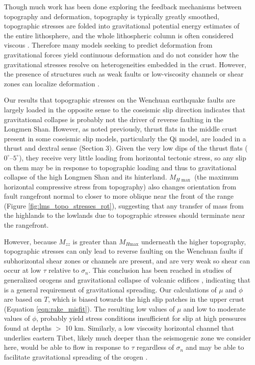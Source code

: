 \documentclass[draft,jgrga]{AGUTeX}
\begin{document}
\begin{article}
Though much work has been done exploring the feedback mechanisms between
topography and deformation, topography is typically greatly smoothed,
topographic stresses are folded into gravitational potential energy
estimates of the entire lithosphere, and the whole lithospheric column
is often considered viscous \citep[e.g.,][]{birdpiper80, copleymckenzie2007,
flesch2010gpe}. Therefore many
models seeking to predict deformation from gravitational forces yield
continuous deformation and do not consider how the gravitational
stresses resolve on heterogeneities embedded in the crust. However, the
presence of structures such as weak faults \citep{bird1994} or
low-viscosity channels or shear zones \citep[e.g.,][]{clark2005} can localize
deformation \citep[e.g.,][]{bird1994, fleschbendick2012}.

Our results that topographic stresses on the Wenchuan
earthquake faults are largely loaded in the opposite sense to the
coseismic slip direction indicates that gravitational collapse is probably
not the driver of reverse faulting in the Longmen Shan. However, as
noted previously, thrust flats in the middle crust present in some
coseismic slip models, particularly the Qi model, are loaded in a thrust
and dextral sense (Section 3). Given the very low dips of the thrust flats
($0^{\circ}$--$5^{\circ}$), they receive very little loading from
horizontal tectonic stress, so any slip on them may be in response to
topographic loading and thus to gravitational collapse of the high
Longmen Shan and its hinterland. $M_{H{\mathrm{\max}}}$ (the maximum horizontal
compressive stress from topography) also changes
orientation from fault rangefront normal to closer to more oblique
near the front of the range (Figure \ref{fig:lms_topo_stresses_rot}),
suggesting that any transfer of mass from the highlands to the lowlands
due to topographic stresses should terminate near the rangefront.

However, because $M_{zz}$ is greater than $M_{H{\mathrm{max}}}$
underneath the higher topography, topographic stresses can only lead to
reverse faulting on the Wenchuan faults if subhorizontal shear zones or
channels are present, and are very weak so shear can occur at 
low $\tau$ relative to $\sigma_n$. This conclusion has been reached in
studies of generalized orogens \citep[e.g.,][]{fleschbendick2012} and
gravitational collapse of volcanic edifices \citep[e.g.,][]{byrne2013},
indicating that is a general requirement of gravitational spreading. Our
calculations of $\mu$ and $\phi$ are based on $T$, which is biased
towards the high slip patches in the upper crust (Equation
\ref{eqn:rake_misfit}).  The resulting low values of $\mu$ and low
to moderate values of $\phi$, probably yield stress conditions insufficient
for slip at high pressures found at depths $>$ 10 km.
Similarly, a low viscosity horizontal
channel that underlies eastern Tibet, likely much deeper than the
seismogenic zone we consider here, would be able to flow in response to
$\tau$ regardless of $\sigma_n$ and may be able to facilitate
gravitational spreading of the orogen \citep[e.g.,][]{clark2005, cook2008,
fleschbendick2012}.


\end{article}
\end{document}
